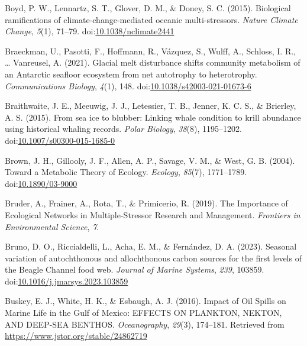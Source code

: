 \documentclass[
]{article}
\newlength{\cslhangindent}
\newlength{\cslentryspacingunit} %
\newenvironment{CSLReferences}[2] %
 {%
  \setlength{\parindent}{0pt}
  \ifodd #1
  \let\oldpar\par
  \def\par{\hangindent=\cslhangindent\oldpar}
  \fi
  \setlength{\parskip}{#2\cslentryspacingunit}
 }%
 {}
\begin{document}
\begin{CSLReferences}{1}{0}
\leavevmode{}%
Boyd, P. W., Lennartz, S. T., Glover, D. M., \& Doney, S. C. (2015).
Biological ramifications of climate-change-mediated oceanic
multi-stressors. \emph{Nature Climate Change}, \emph{5}(1), 71--79.
doi:\href{https://doi.org/10.1038/nclimate2441}{10.1038/nclimate2441}

\leavevmode{}%
Braeckman, U., Pasotti, F., Hoffmann, R., Vázquez, S., Wulff, A.,
Schloss, I. R., \ldots{} Vanreusel, A. (2021). Glacial melt disturbance
shifts community metabolism of an {Antarctic} seafloor ecosystem from
net autotrophy to heterotrophy. \emph{Communications Biology},
\emph{4}(1), 148.
doi:\href{https://doi.org/10.1038/s42003-021-01673-6}{10.1038/s42003-021-01673-6}

\leavevmode{}%
Braithwaite, J. E., Meeuwig, J. J., Letessier, T. B., Jenner, K. C. S.,
\& Brierley, A. S. (2015). From sea ice to blubber: Linking whale
condition to krill abundance using historical whaling records.
\emph{Polar Biology}, \emph{38}(8), 1195--1202.
doi:\href{https://doi.org/10.1007/s00300-015-1685-0}{10.1007/s00300-015-1685-0}

\leavevmode{}%
Brown, J. H., Gillooly, J. F., Allen, A. P., Savage, V. M., \& West, G.
B. (2004). Toward a {Metabolic Theory} of {Ecology}. \emph{Ecology},
\emph{85}(7), 1771--1789.
doi:\href{https://doi.org/10.1890/03-9000}{10.1890/03-9000}

\leavevmode{}%
Bruder, A., Frainer, A., Rota, T., \& Primicerio, R. (2019). The
{Importance} of {Ecological Networks} in {Multiple-Stressor Research}
and {Management}. \emph{Frontiers in Environmental Science}, \emph{7}.

\leavevmode{}%
Bruno, D. O., Riccialdelli, L., Acha, E. M., \& Fernández, D. A. (2023).
Seasonal variation of autochthonous and allochthonous carbon sources for
the first levels of the {Beagle Channel} food web. \emph{Journal of
Marine Systems}, \emph{239}, 103859.
doi:\href{https://doi.org/10.1016/j.jmarsys.2023.103859}{10.1016/j.jmarsys.2023.103859}

\leavevmode{}%
Buskey, E. J., White, H. K., \& Esbaugh, A. J. (2016). Impact of {Oil
Spills} on {Marine Life} in the {Gulf} of {Mexico}: {EFFECTS ON
PLANKTON}, {NEKTON}, {AND DEEP-SEA BENTHOS}. \emph{Oceanography},
\emph{29}(3), 174--181. Retrieved from
\url{https://www.jstor.org/stable/24862719}


\end{CSLReferences}
\end{document}
